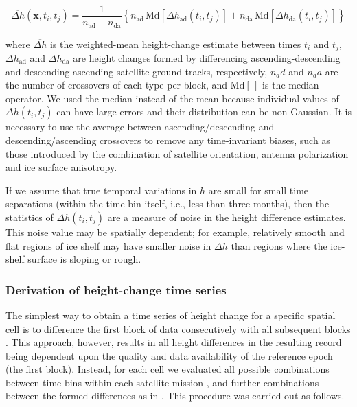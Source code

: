 \begin{equation}
  \overbar{\Delta h}(\mathbf{x}, t_i, t_j) = \frac{1}{n_\text{ad} + n_\text{da}} 
  \left\{
  n_\text{ad} \, \text{Md}\!\left[ \Delta h_\text{ad}(t_i, t_j) \right] +
  n_\text{da} \, \text{Md}\!\left[ \Delta h_\text{da}(t_i, t_j) \right]
  \right\}
  \label{c2e1}
\end{equation}

\noindent
where $\overbar{\Delta h}$ is the weighted-mean height-change estimate between times $t_i$ and $t_j$, $\Delta h_\text{ad}$ and $\Delta h_\text{da}$ are height changes formed by differencing ascending-descending and descending-ascending satellite ground tracks, respectively, $n_ad$ and $n_da$ are the number of crossovers of each type per block, and $\text{Md}[\,]$ is the median operator. We used the median instead of the mean because individual values of $\Delta h(t_i,t_j)$ can have large errors and their distribution can be non-Gaussian. It is necessary to use the average between ascending/descending and descending/ascending crossovers to remove any time-invariant biases, such as those introduced by the combination of satellite orientation, antenna polarization and ice surface anisotropy.

If we assume that true temporal variations in $h$ are small for small time separations (within the time bin itself, i.e., less than three months), then the statistics of $\Delta h(t_i,t_j)$ are a measure of noise in the height difference estimates. This noise value may be spatially dependent; for example, relatively smooth and flat regions of ice shelf may have smaller noise in $\Delta h$ than regions where the ice-shelf surface is sloping or rough.

\subsubsection{Derivation of height-change time series}

The simplest way to obtain a time series of height change for a specific spatial cell is to difference the first block of data consecutively with all subsequent blocks \parencite[e.g.,][]{Zwally1989}. This approach, however, results in all height differences in the resulting record being dependent upon the quality and data availability of the reference epoch (the first block). Instead, for each cell we evaluated all possible combinations between time bins within each satellite mission \parencite{Zwally2001, Li2006}, and further combinations between the formed differences as in \textcite{Khvorostovsky2012}. This procedure was carried out as follows.

